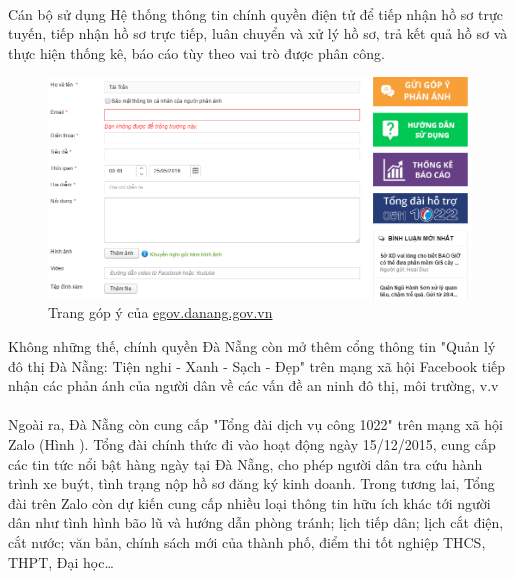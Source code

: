 \documentclass[a4paper]{article}
\begin{document}
\\
Cán bộ sử dụng Hệ thống thông tin chính quyền điện tử để tiếp nhận hồ sơ trực tuyến, tiếp nhận hồ sơ trực tiếp, luân chuyển và xử lý hồ sơ, trả kết quả hồ sơ và thực hiện thống kê, báo cáo tùy theo vai trò được phân công.
\begin{center}
    \begin{figure}[h]
    \begin{center}
     \includegraphics[scale=.55]{gopy-danang.PNG}
    \end{center}
    \caption{Trang góp ý của \href{egov.danang.gov.vn}{egov.danang.gov.vn}}
    \label{refhinh7}
    \end{figure}
\end{center}
Không những thế, chính quyền Đà Nẵng còn mở thêm cổng thông tin "Quản lý đô thị Đà Nẵng: Tiện nghi - Xanh - Sạch - Đẹp" trên mạng xã hội Facebook tiếp nhận các phản ánh của người dân về các vấn đề an ninh đô thị, môi trường, v.v\\
\\
Ngoài ra, Đà Nẵng còn cung cấp "Tổng đài dịch vụ công 1022" trên mạng xã hội Zalo (Hình ). Tổng đài chính thức đi vào hoạt động ngày 15/12/2015, cung cấp các tin tức nổi bật hàng ngày tại Đà Nẵng, cho phép người dân tra cứu hành trình xe buýt, tình trạng nộp hồ sơ đăng ký kinh doanh. Trong tương lai, Tổng đài trên Zalo còn dự kiến cung cấp nhiều loại thông tin hữu ích khác tới người dân như tình hình bão lũ và hướng dẫn phòng tránh; lịch tiếp dân; lịch cắt điện, cắt nước; văn bản, chính sách mới của thành phố, điểm thi tốt nghiệp THCS, THPT, Đại học…
\end{document}
